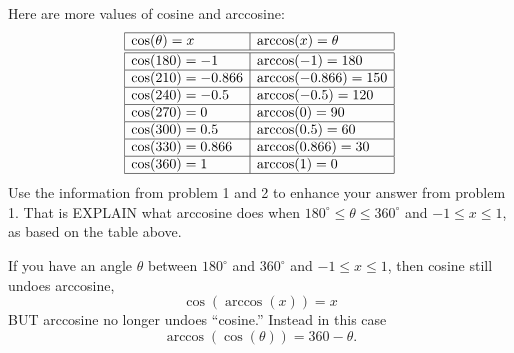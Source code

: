 \documentclass[noauthor,nooutcomes,handout,hints]{ximera}
\begin{document}
\begin{question}
  Here are more values of cosine and arccosine:
  \[
  \begin{array}{|l|l|}
    \hline
    \cos(\theta) =x      & \arccos(x) = \theta\\ \hline\hline
    \cos(180) =-1      & \arccos(-1) = 180\\ \hline
    \cos(210) = -0.866 & \arccos(-0.866) = 150\\ \hline
    \cos(240) = -0.5   & \arccos(-0.5) = 120\\ \hline
    \cos(270) = 0      & \arccos(0) = 90\\ \hline
    \cos(300) = 0.5     & \arccos(0.5) = 60\\ \hline
    \cos(330) = 0.866   & \arccos(0.866) = 30\\ \hline
    \cos(360)  = 1     & \arccos(1) = 0 \\    \hline
  \end{array}
  \]
  Use the information from problem 1 and 2 to enhance your answer from
  problem 1. That is EXPLAIN what arccosine does when $180^\circ \le
  \theta \le 360^\circ$ and $-1\le x\le 1$, as based on the table
  above.
  \begin{freeResponse}
    If you have an angle $\theta$ between $180^\circ$ and $360^\circ$
    and $-1\le x\le 1$, then cosine still undoes arccosine,
    \[
    \cos(\arccos(x)) = x
    \]
    BUT arccosine no longer undoes ``cosine.'' Instead in this case
    \[
    \arccos(\cos(\theta)) = 360-\theta.
    \]
  \end{freeResponse}
\end{question}
\mynewpage
\end{document}

